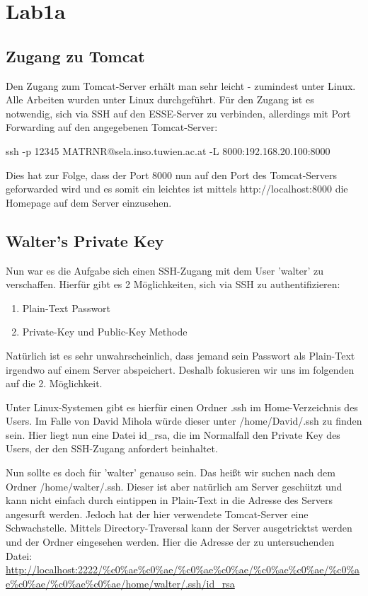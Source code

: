 \section{Lab1a}

\subsection{Zugang zu Tomcat}
Den Zugang zum Tomcat-Server erhält man sehr leicht - zumindest unter Linux. Alle Arbeiten wurden unter Linux
durchgeführt. Für den Zugang ist es notwendig, sich via SSH auf den ESSE-Server zu verbinden, allerdings mit Port Forwarding
auf den angegebenen Tomcat-Server:

ssh -p 12345 MATRNR@sela.inso.tuwien.ac.at -L 8000:192.168.20.100:8000

Dies hat zur Folge, dass der Port 8000 nun auf den Port des Tomcat-Servers geforwarded wird und es somit ein leichtes
ist mittels http://localhost:8000 die Homepage auf dem Server einzusehen.

\subsection{Walter's Private Key}
Nun war es die Aufgabe sich einen SSH-Zugang mit dem User 'walter' zu verschaffen. Hierfür gibt es 2 Möglichkeiten, sich
via SSH zu authentifizieren:
\begin{enumerate}
\item Plain-Text Passwort
\item Private-Key und Public-Key Methode
\end{enumerate}

Natürlich ist es sehr unwahrscheinlich, dass jemand sein Passwort als Plain-Text irgendwo auf einem Server abspeichert. Deshalb
fokusieren wir uns im folgenden auf die 2. Möglichkeit.

Unter Linux-Systemen gibt es hierfür einen Ordner .ssh im Home-Verzeichnis des Users. Im Falle von David Mihola würde
dieser unter /home/David/.ssh zu finden sein. Hier liegt nun eine Datei id\_rsa, die im Normalfall den Private Key
des Users, der den SSH-Zugang anfordert beinhaltet.

Nun sollte es doch für 'walter' genauso sein. Das heißt wir suchen nach dem Ordner /home/walter/.ssh. Dieser ist aber
natürlich am Server geschützt und kann nicht einfach durch eintippen in Plain-Text in die Adresse des Servers
angesurft werden. Jedoch hat der hier verwendete Tomcat-Server eine Schwachstelle. Mittels Directory-Traversal kann
der Server ausgetricktst werden und der Ordner eingesehen werden. Hier die Adresse der zu untersuchenden Datei:
\url{http://localhost:2222/%c0%ae%c0%ae/%c0%ae%c0%ae/%c0%ae%c0%ae/%c0%ae%c0%ae/%c0%ae%c0%ae/home/walter/.ssh/id\_rsa}

